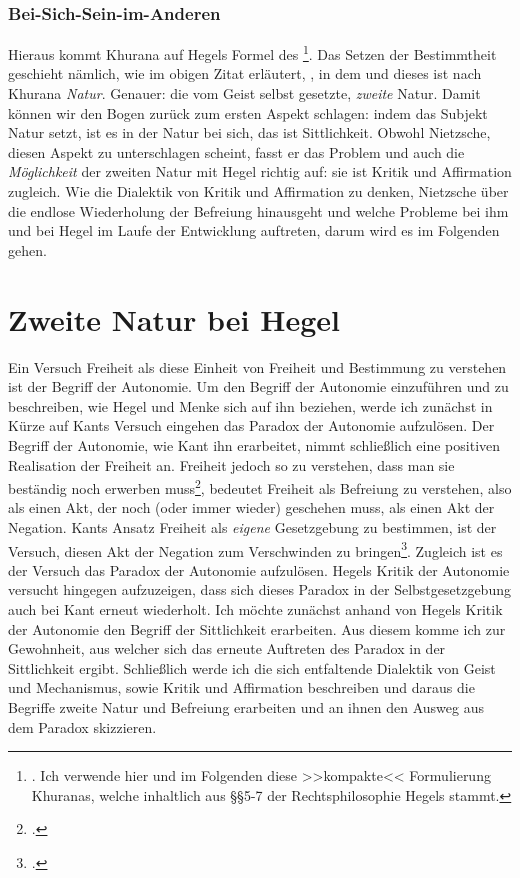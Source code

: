 \documentclass[12pt, a4paper, openany]{report}
\begin{document}
\subsubsection{Bei-Sich-Sein-im-Anderen}
Hieraus kommt Khurana auf Hegels Formel des %
\footnote{
    \cite[][283]{khurana_freiheit_2017}.
    Ich verwende hier und im Folgenden diese >>kompakte<< Formulierung Khuranas, welche inhaltlich aus §§5-7 der Rechtsphilosophie Hegels stammt.
}.
Das Setzen der Bestimmtheit geschieht nämlich, wie im obigen Zitat erläutert, , in dem  und dieses ist nach Khurana \emph{Natur}. 
Genauer: die vom Geist selbst gesetzte, \emph{zweite} Natur.
Damit können wir den Bogen zurück zum ersten Aspekt schlagen: 
indem das Subjekt Natur setzt, ist es in der Natur bei sich, das ist Sittlichkeit.
Obwohl Nietzsche, diesen Aspekt zu unterschlagen scheint, fasst er das Problem und auch die \emph{Möglichkeit} der zweiten Natur mit Hegel richtig auf: 
sie ist Kritik und Affirmation zugleich.
Wie die Dialektik von Kritik und Affirmation zu denken, Nietzsche über die endlose Wiederholung der Befreiung hinausgeht und welche Probleme bei ihm und bei Hegel im Laufe der Entwicklung auftreten, darum wird es im Folgenden gehen.

\section{Zweite Natur bei Hegel}\label{abschnitt_1}
Ein Versuch Freiheit als diese Einheit von Freiheit und Bestimmung zu verstehen ist der Begriff der Autonomie. 
Um den Begriff der Autonomie einzuführen und zu beschreiben, wie Hegel und Menke sich auf ihn beziehen, werde ich zunächst in Kürze auf Kants Versuch eingehen das Paradox der Autonomie aufzulösen.
Der Begriff der Autonomie, wie Kant ihn erarbeitet, nimmt schließlich eine positiven Realisation der Freiheit an.
Freiheit jedoch so zu verstehen, dass man sie beständig noch erwerben muss\footcite[Vgl.][636]{nietzsche_morgenrote_1999}, bedeutet Freiheit als Befreiung zu verstehen, also als einen Akt, der noch (oder immer wieder) geschehen muss, als einen Akt der Negation.
Kants Ansatz Freiheit als \emph{eigene} Gesetzgebung zu bestimmen, ist der Versuch, diesen Akt der Negation zum Verschwinden zu bringen\footcite[Vgl.][53]{menke_autonomie_2018}.
Zugleich ist es der Versuch das Paradox der Autonomie aufzulösen.
Hegels Kritik der Autonomie versucht hingegen aufzuzeigen, dass sich dieses Paradox in der Selbstgesetzgebung auch bei Kant erneut wiederholt.
Ich möchte zunächst anhand von Hegels Kritik der Autonomie den Begriff der Sittlichkeit erarbeiten.
Aus diesem komme ich zur Gewohnheit, aus welcher sich das erneute Auftreten des Paradox in der Sittlichkeit ergibt.
Schließlich werde ich die sich entfaltende Dialektik von Geist und Mechanismus, sowie Kritik und Affirmation beschreiben und daraus die Begriffe zweite Natur und Befreiung erarbeiten und an ihnen den Ausweg aus dem Paradox skizzieren.
\end{document}
